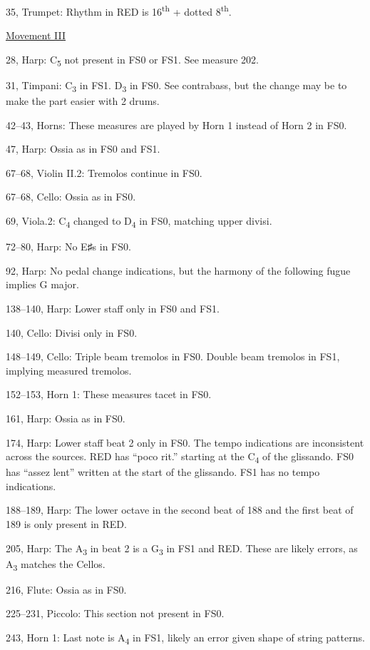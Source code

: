 \documentclass[twoside]{article}
\begin{document}
\begin{hangparas}{15pt}{1}
\begin{multicols}{2}
35, Trumpet: Rhythm in RED is 16\textsuperscript{th} + dotted 8\textsuperscript{th}.

\underline{Movement III}

28, Harp: C\textsubscript{5} not present in FS0 or FS1. See measure 202.

31, Timpani: C\textsubscript{3} in FS1. D\textsubscript{3} in FS0. See contrabass, but the change may be to make the part easier with 2 drums.

42--43, Horns: These measures are played by Horn 1 instead of Horn 2 in FS0.

47, Harp: Ossia as in FS0 and FS1.

67--68, Violin II.2: Tremolos continue in FS0.

67--68, Cello: Ossia as in FS0.

69, Viola.2: C\textsubscript{4} changed to D\textsubscript{4} in FS0, matching upper divisi.

72--80, Harp: No E♯s in FS0.

92, Harp: No pedal change indications, but the harmony of the following fugue implies G major.

138--140, Harp: Lower staff only in FS0 and FS1.

140, Cello: Divisi only in FS0.

148--149, Cello: Triple beam tremolos in FS0. Double beam tremolos in FS1, implying measured tremolos.

152--153, Horn 1: These measures tacet in FS0.

161, Harp: Ossia as in FS0.

174, Harp: Lower staff beat 2 only in FS0. The tempo indications are inconsistent across the sources. RED has ``poco rit.'' starting at the C\textsubscript{4} of the glissando. FS0 has ``assez lent'' written at the start of the glissando. FS1 has no tempo indications.

188--189, Harp: The lower octave in the second beat of 188 and the first beat of 189 is only present in RED.

205, Harp: The A\textsubscript{3} in beat 2 is a G\textsubscript{3} in FS1 and RED. These are likely errors, as A\textsubscript{3} matches the Cellos.

216, Flute: Ossia as in FS0.

225--231, Piccolo: This section not present in FS0.

243, Horn 1: Last note is A\textsubscript{4} in FS1, likely an error given shape of string patterns.


\end{multicols}
\end{hangparas}
\end{document}
